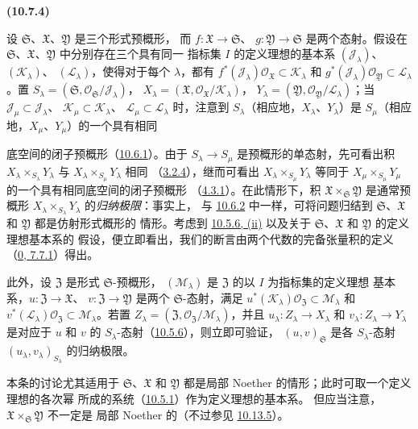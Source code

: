 \documentclass[UTF8,fontset=none,11pt,oneside,openany]{ctexbook}
\newenvironment{env}[1][]{%
  \par\medskip\noindent\textbf{(#1)}\ %
}{\par}
\newcommand{\oldpage}[2][]{%
  \hypertarget{ega-source-page-#1-#2}{}%
  \marginnote{\scriptsize\textbf{#1}~|~#2}\ignorespaces}
\let\EGAOriginalLabel\label
\renewcommand{\label}[1]{\phantomsection\EGAOriginalLabel{#1}}
\begin{document}
\begin{env}[10.7.4]
\label{I.10.7.4-fr}
设 $\mathfrak{S}$、$\mathfrak{X}$、$\mathfrak{Y}$ 是三个形式预概形，
而 $f:\mathfrak{X}\to\mathfrak{S}$、
$g:\mathfrak{Y}\to\mathfrak{S}$ 是两个态射。假设在
$\mathfrak{S}$、$\mathfrak{X}$、$\mathfrak{Y}$ 中分别存在三个具有同一
指标集 $I$ 的定义理想的基本系
$(\mathscr{J}_\lambda)$、$(\mathscr{K}_\lambda)$、
$(\mathscr{L}_\lambda)$，使得对于每个 $\lambda$，都有
$f^*(\mathscr{J}_\lambda)\mathscr{O}_{\mathfrak{X}}
\subset\mathscr{K}_\lambda$ 和
$g^*(\mathscr{J}_\lambda)\mathscr{O}_{\mathfrak{Y}}
\subset\mathscr{L}_\lambda$。置
$S_\lambda=(\mathfrak{S},
\mathscr{O}_{\mathfrak{S}}/\mathscr{J}_\lambda)$，
$X_\lambda=(\mathfrak{X},
\mathscr{O}_{\mathfrak{X}}/\mathscr{K}_\lambda)$，
$Y_\lambda=(\mathfrak{Y},
\mathscr{O}_{\mathfrak{Y}}/\mathscr{L}_\lambda)$；当
$\mathscr{J}_\mu\subset\mathscr{J}_\lambda$、
$\mathscr{K}_\mu\subset\mathscr{K}_\lambda$、
$\mathscr{L}_\mu\subset\mathscr{L}_\lambda$ 时，注意到
$S_\lambda$（相应地，$X_\lambda$、$Y_\lambda$）是
$S_\mu$（相应地，$X_\mu$、$Y_\mu$）的一个具有相同

\oldpage[I]{194}

底空间的闭子预概形（\hyperref[I.10.6.1-fr]{10.6.1}）。由于
$S_\lambda\to S_\mu$ 是预概形的单态射，先可看出积
$X_\lambda\times_{S_\lambda}Y_\lambda$ 与
$X_\lambda\times_{S_\mu}Y_\lambda$ 相同
（\hyperref[I.3.2.4-fr]{3.2.4}），继而可看出
$X_\lambda\times_{S_\mu}Y_\lambda$ 等同于
$X_\mu\times_{S_\mu}Y_\mu$ 的一个具有相同底空间的闭子预概形
（\hyperref[I.4.3.1-fr]{4.3.1}）。在此情形下，积
$\mathfrak{X}\times_{\mathfrak{S}}\mathfrak{Y}$ 是通常预概形
$X_\lambda\times_{S_\lambda}Y_\lambda$ 的\emph{归纳极限}：事实上，
与 \hyperref[I.10.6.2-fr]{10.6.2} 中一样，可将问题归结到
$\mathfrak{S}$、$\mathfrak{X}$ 和 $\mathfrak{Y}$ 都是仿射形式概形的
情形。考虑到 \hyperref[I.10.5.6-fr]{10.5.6, (ii)} 以及关于
$\mathfrak{S}$、$\mathfrak{X}$ 和 $\mathfrak{Y}$ 的定义理想基本系的
假设，便立即看出，我们的断言由两个代数的完备张量积的定义
（\hyperref[0.7.7.1-fr]{0, 7.7.1}）得出。

此外，设 $\mathfrak{Z}$ 是形式 $\mathfrak{S}$-预概形，
$(\mathscr{M}_\lambda)$ 是 $\mathfrak{Z}$ 的以 $I$ 为指标集的定义理想
基本系，$u:\mathfrak{Z}\to\mathfrak{X}$、
$v:\mathfrak{Z}\to\mathfrak{Y}$ 是两个 $\mathfrak{S}$-态射，满足
$u^*(\mathscr{K}_\lambda)\mathscr{O}_{\mathfrak{Z}}
\subset\mathscr{M}_\lambda$ 和
$v^*(\mathscr{L}_\lambda)\mathscr{O}_{\mathfrak{Z}}
\subset\mathscr{M}_\lambda$。若置
$Z_\lambda=(\mathfrak{Z},
\mathscr{O}_{\mathfrak{Z}}/\mathscr{M}_\lambda)$，并且
$u_\lambda:Z_\lambda\to X_\lambda$ 和
$v_\lambda:Z_\lambda\to Y_\lambda$ 是对应于 $u$ 和 $v$ 的
$S_\lambda$-态射（\hyperref[I.10.5.6-fr]{10.5.6}），则立即可验证，
$(u,v)_{\mathfrak{S}}$ 是各 $S_\lambda$-态射
$(u_\lambda,v_\lambda)_{S_\lambda}$ 的归纳极限。

本条的讨论尤其适用于 $\mathfrak{S}$、$\mathfrak{X}$ 和
$\mathfrak{Y}$ 都是局部 Noether 的情形；此时可取一个定义理想的各次幂
所成的系统（\hyperref[I.10.5.1-fr]{10.5.1}）作为定义理想的基本系。
但应当注意，$\mathfrak{X}\times_{\mathfrak{S}}\mathfrak{Y}$ 不一定是
局部 Noether 的（不过参见 \hyperref[I.10.13.5-fr]{10.13.5}）。
\end{env}
\end{document}
